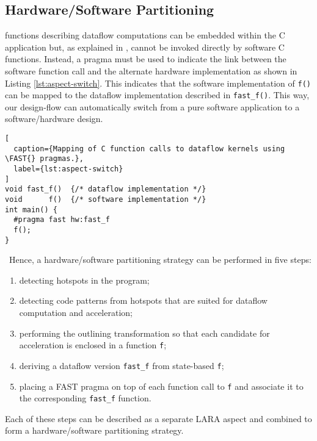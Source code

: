 \subsection{Hardware/Software Partitioning}
\label{sect:asp_hsp}
\FAST{} functions describing dataflow computations can be embedded
within the C application but, as explained in
, cannot be invoked directly by software C
functions. Instead, a \FAST{} pragma must be used to indicate the
link between the software function call and the alternate hardware
implementation as shown in Listing \ref{lst:aspect-switch}. This
indicates that the software implementation of \texttt{f()} can be
mapped to the dataflow implementation described in
\texttt{fast\_f()}. This way, our design-flow can automatically switch
from a pure software application to a software/hardware design.

\lstset{style=MaxC}
\begin{lstlisting}[
  caption={Mapping of C function calls to dataflow kernels using \FAST{} pragmas.},
  label={lst:aspect-switch}
]
void fast_f()  {/* dataflow implementation */}
void      f()  {/* software implementation */}
int main() {
  #pragma fast hw:fast_f
  f();
}
\end{lstlisting}
\
Hence, a hardware/software partitioning strategy can be performed in
five steps:
\begin{enumerate}
  \item detecting hotspots in the program;
  \item detecting code patterns from hotspots that are suited for
    dataflow computation and acceleration;
  \item performing the outlining transformation so that each
    candidate for acceleration is enclosed in a function \texttt{f};
  \item deriving a dataflow version \texttt{fast\_f} from state-based
    \texttt{f};
  \item placing a FAST pragma on top of each function call to
    \texttt{f} and associate it to the corresponding \texttt{fast\_f}
    function.
\end{enumerate}

Each of these steps can be described as a separate LARA aspect and
combined to form a hardware/software partitioning strategy.



